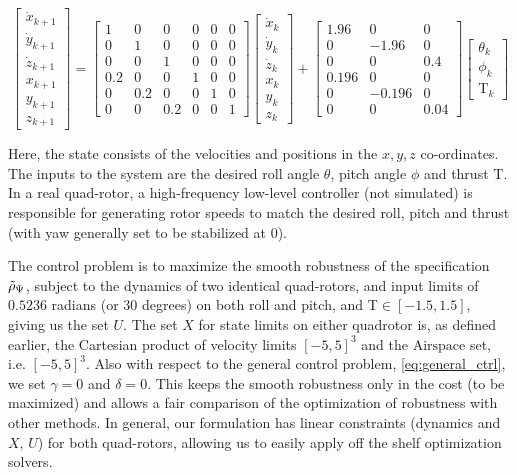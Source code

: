 {\tiny
\begin{equation}
\label{eq:quad_dyn}
\begin{bmatrix} \dot{x}_{k+1} \\ \dot{y}_{k+1} \\ \dot{z}_{k+1} \\ x_{k+1} \\ y_{k+1} \\ z_{k+1} \end{bmatrix}= \begin{bmatrix} 1&0&0&0&0&0 \\0&1&0&0&0&0 \\0&0&1&0&0&0 \\0.2&0&0&1&0&0 \\0&0.2&0&0&1&0 \\0&0&0.2&0&0&1\end{bmatrix} \begin{bmatrix} \dot{x}_{k} \\ \dot{y}_{k} \\ \dot{z}_{k} \\ x_{k} \\ y_{k} \\ z_{k} \end{bmatrix} + \begin{bmatrix} 1.96&0&0 \\ 0&-1.96&0 \\0&0&0.4 \\0.196&0&0 \\0&-0.196&0\\0&0&0.04 \end{bmatrix} \begin{bmatrix} \theta_k \\ \phi_k \\ \text{T}_k \end{bmatrix}
\end{equation}
}

Here, the state consists of the velocities and positions in the $x,y,z$ co-ordinates. The inputs to the system are the desired roll angle $\theta$, pitch angle $\phi$ and thrust $\text{T}$. In a real quad-rotor, a high-frequency low-level controller (not simulated) is responsible for generating rotor speeds to match the desired roll, pitch and thrust (with yaw generally set to be stabilized at $0$). 

The control problem is to maximize the smooth robustness of the specification $\tilde{\rho}_{\Psi}$, subject to the dynamics of two identical quad-rotors, and input limits of $0.5236$ radians (or $30$ degrees) on both roll and pitch, and $\text{T}\in[-1.5,1.5]$, giving us the set $U$. The set $X$ for state limits on either quadrotor is, as defined earlier, the Cartesian product of velocity limits $[-5,5]^3$ and the $\text{Airspace}$ set, i.e. $[-5,5]^3$. Also with respect to the general control problem, \eqref{eq:general_ctrl}, we set $\gamma=0$ and $\delta=0$. This keeps the smooth robustness only in the cost (to be maximized) and allows a fair comparison of the optimization of robustness with other methods. In general, our formulation has linear constraints (dynamics and $X$, $U$) for both quad-rotors, allowing us to easily apply off the shelf optimization solvers.

